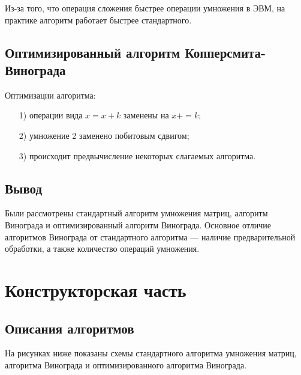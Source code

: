 \documentclass[a4paper,14pt, unknownkeysallowed]{extreport}
\begin{document}
Из-за того, что операция сложения быстрее операции умножения в ЭВМ, на практике алгоритм работает быстрее стандартного.

\section{Оптимизированный алгоритм Копперсмита-Винограда}

Оптимизации алгоритма:
\begin{enumerate}
	\item[1)] операции вида $x = x + k$ заменены на $x += k$;
	\item[2)] умножение 2 заменено побитовым сдвигом;
	\item[3)] происходит предвычисление некоторых слагаемых алгоритма.
\end{enumerate}
	
	
\section*{Вывод}
	
Были рассмотрены стандартный алгоритм умножения матриц, алгоритм Винограда и оптимизированный алгоритм Винограда. Основное отличие алгоритмов Винограда от стандартного алгоритма — наличие предварительной обработки, а также количество операций умножения.
	
\clearpage
	
\chapter{Конструкторская часть}

\section{Описания алгоритмов}
	
На рисунках ниже показаны схемы стандартного алгоритма умножения матриц, алгоритма Винограда и оптимизированного алгоритма Винограда.
\end{document}
